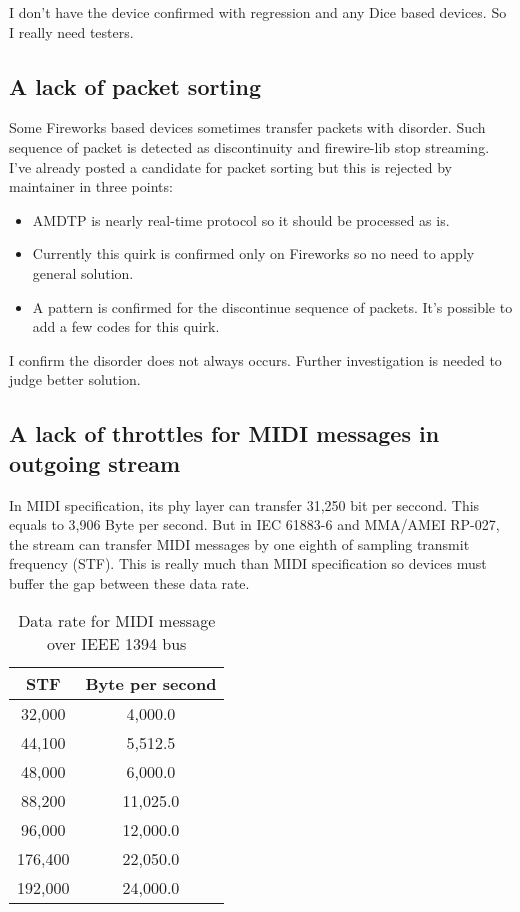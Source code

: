 \documentclass[onecolumn]{article}
\begin{document}
I don't have the device confirmed with regression and any Dice based devices. So I really need testers.

\subsection{A lack of packet sorting}
Some Fireworks based devices sometimes transfer packets with disorder. Such sequence of packet is detected as discontinuity and firewire-lib stop streaming. I've already posted a candidate for packet sorting but this is rejected by maintainer in three points:
\begin{itemize}
\item AMDTP is nearly real-time protocol so it should be processed as is.
\item Currently this quirk is confirmed only on Fireworks so no need to apply general solution.
\item A pattern is confirmed for the discontinue sequence of packets. It's possible to add a few codes for this quirk.
\end{itemize}

I confirm the disorder does not always occurs. Further investigation is needed to judge better solution.

\subsection{A lack of throttles for MIDI messages in outgoing stream}
In MIDI specification, its phy layer can transfer 31,250 bit per seccond. This equals to 3,906 Byte per second. But in IEC 61883-6\cite{iec61883-6-1, iec61883-6-2} and MMA/AMEI RP-027\cite{amei-rp27}, the stream can transfer MIDI messages by one eighth of sampling transmit frequency (STF). This is really much than MIDI specification so devices must buffer the gap between these data rate.

\begin{table}[H]
	\centering
	\caption{{Data rate for MIDI message over IEEE 1394 bus}}
	\label{tbl:midi-rate}
	\begin{tabular}{cc} \toprule
		STF	& Byte per second \\ \midrule
		32,000	& 4,000.0	\\
		44,100	& 5,512.5	\\
		48,000	& 6,000.0	\\
		88,200	& 11,025.0	\\
		96,000	& 12,000.0	\\
		176,400	& 22,050.0	\\
		192,000	& 24,000.0	\\ \bottomrule
	\end{tabular}
\end{table}
\end{document}

